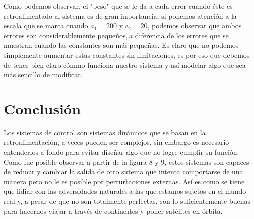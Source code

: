 \documentclass[12pt, letterpaper]{article}
\begin{document}
Como podemos observar, el "peso" que se le da a cada error cuando éste es retroalimentado al sistema es de gran importancia, si ponemos atención a la escala que se marca cuando $a_1 = 200$ y $a_2 = 20$, podemos observar que ambos errores son considerablemente pequeños, a diferencia de los errores que se muestran cuando las constantes son más pequeñas. Es claro que no podemos simplemente aumentar estas constantes sin limitaciones, es por eso que debemos de tener bien claro cómmo funciona nuestro sistema y así modelar algo que sea más sencillo de modificar.

\section*{Conclusión}
Los sistemas de control son sistemas dinámicos que se basan en la retroalimentación, a veces pueden ser complejos, sin embargo es necesario entenderlos a fondo para evitar diseñar algo que no logre cumplir su función. Como fue posible observar a partir de la figura 8 y 9, estos sistemas son capaces de reducir y cambiar la salida de otro sistema que intenta comportarse de una manera pero no le es posible por perturbaciones externas. Así es como se tiene que lidiar con las adversidades naturales a las que estamos sujetos en el mundo real y, a pesar de que no son totalmente perfectas, son lo suficientemente buenas para hacernos viajar a través de continentes y poner satélites en órbita.
\renewcommand\refname{Referencias}
\printbibliography
\end{document}
